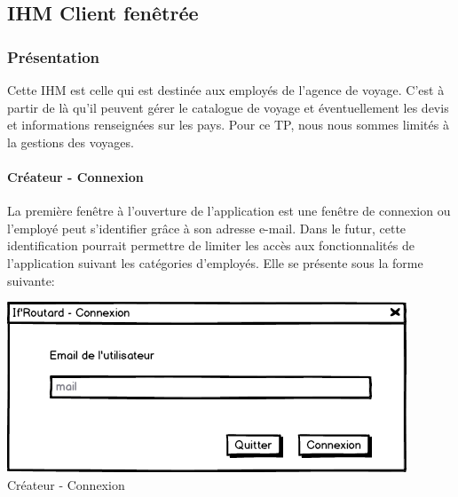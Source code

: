 \documentclass[11pt]{article}
\begin{document}
\subsection{IHM Client fenêtrée}
\subsubsection{Présentation}
Cette IHM est celle qui est destinée aux employés de l'agence de voyage. C'est à partir de là qu'il peuvent gérer le catalogue de voyage et éventuellement les devis et informations renseignées sur les pays. Pour ce TP, nous nous sommes limités à  la gestions des voyages. 
\paragraph{Créateur - Connexion}
La première fenêtre à l'ouverture de l'application est une fenêtre de connexion ou l'employé peut s'identifier grâce à son adresse e-mail. Dans le futur, cette identification pourrait permettre de limiter les accès aux fonctionnalités de l'application suivant les catégories d'employés. Elle se présente sous la forme suivante:
\begin{center}
\includegraphics[scale = 0.5]{../Conception_graphique/png_Pour_CR/Createur-00-Connexion.png}
\newline
Créateur - Connexion
\label{fig:Cr-Connexion}
\end{center}
\end{document}
